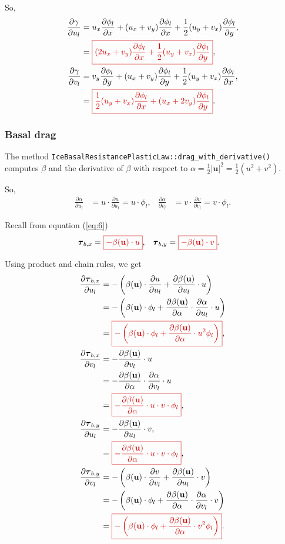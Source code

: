\documentclass{amsart}
\newcommand{\U}{\mathbf{u}}
\newcommand{\T}{\boldsymbol{\tau}}
\newcommand{\diff}[2]{\ensuremath{\frac{\partial #1}{\partial #2}}}
\newcommand{\betaU}{\beta(\U)}
\newcommand{\basalshearstress}[1]{\T_{b#1}}
\newcommand{\taubx}{\basalshearstress{,x}}
\newcommand{\tauby}{\basalshearstress{,y}}
\newcommand{\highlight}[1]{{\color{red!80!black} \fbox{$ \displaystyle #1 $} }}
\begin{document}
So,
\begin{align}
  \diff{\gamma}{u_l} &= u_x \diff{\phi_l}{x} + (u_x + v_y)\diff{\phi_l}{x} + \frac{1}{2} (u_y + v_x)\diff{\phi_l}{y},\notag\\
                     &= \highlight{ (2 u_x + v_y) \diff{\phi_l}{x} + \frac{1}{2} (u_y + v_x)\diff{\phi_l}{y} },\\
  \diff{\gamma}{v_l} &= v_y \diff{\phi_l}{y} + (u_x + v_y)\diff{\phi_l}{y} + \frac{1}{2} (u_y + v_x)\diff{\phi_l}{x},\notag\\
                     &= \highlight{ \frac{1}{2} (u_y + v_x)\diff{\phi_l}{x} + (u_x + 2 v_y)\diff{\phi_l}{y} }.
\end{align}


\subsubsection{Basal drag}
\label{sec:basal-drag}

The method \texttt{IceBasalResistancePlasticLaw::drag_with_derivative()} computes $\beta$ and the derivative of $\beta$ with respect to $\alpha = \frac12 |\U|^2 = \frac12 (u^2 + v^2)$.

So,
\begin{align*}
  \diff{\alpha}{u_l} &= u\cdot \diff{u}{u_l} = u\cdot \phi_l,&
  \diff{\alpha}{v_l} &= v\cdot \diff{v}{v_l} = v\cdot \phi_l.
\end{align*}

Recall from equation (\ref{eq:6})
\begin{align*}
  \taubx &=  \highlight{ - \betaU\cdot u }, &  \tauby &= \highlight{ - \betaU\cdot v }.
\end{align*}

Using product and chain rules, we get
\begin{align*}
  \diff{\taubx}{u_l} &= -\left(\betaU\cdot \diff{u}{u_l} + \diff{\betaU}{u_l}\cdot u\right)\\
                     &= -\left( \betaU\cdot \phi_l + \diff{\betaU}{\alpha}\cdot \diff{\alpha}{u_l}\cdot u \right)\\
                     &= \highlight{ -\left( \betaU\cdot \phi_l + \diff{\betaU}{\alpha}\cdot u^2 \phi_l \right) },\\
  \diff{\taubx}{v_l} &= -\diff{\betaU}{v_l}\cdot u\\
                     &= -\diff{\betaU}{\alpha}\cdot \diff{\alpha}{v_l}\cdot u\\
                     &= \highlight{ -\diff{\betaU}{\alpha}\cdot u\cdot v \cdot \phi_l },\\
  \diff{\tauby}{u_l} &= -\diff{\betaU}{u_l}\cdot v,\\
                     &= \highlight{ -\diff{\betaU}{\alpha}\cdot u\cdot v \cdot \phi_l },\\
  \diff{\tauby}{v_l} &= -\left( \betaU\cdot \diff{v}{v_l} + \diff{\betaU}{u_l}\cdot v \right)\\
                     &= -\left( \betaU\cdot \phi_l + \diff{\betaU}{\alpha}\cdot \diff{\alpha}{v_l}\cdot v \right)\\
                     &= \highlight{ -\left( \betaU\cdot \phi_l + \diff{\betaU}{\alpha}\cdot v^2 \phi_l \right) }.
\end{align*}
\end{document}
